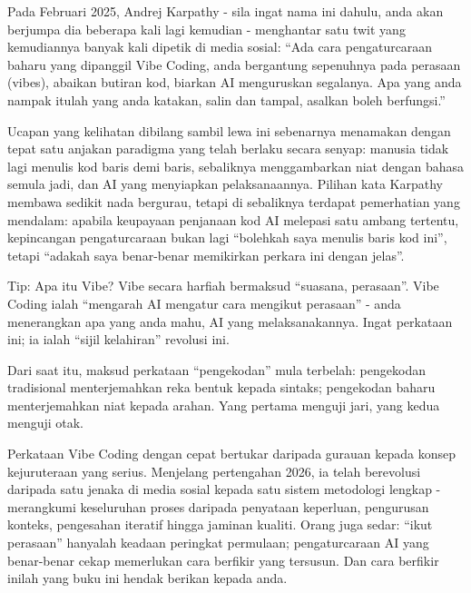 


Pada Februari 2025, Andrej Karpathy - sila ingat nama ini dahulu, anda akan berjumpa dia beberapa kali lagi kemudian - menghantar satu twit yang kemudiannya banyak kali dipetik di media sosial: “Ada cara pengaturcaraan baharu yang dipanggil Vibe Coding, anda bergantung sepenuhnya pada perasaan (vibes), abaikan butiran kod, biarkan AI menguruskan segalanya. Apa yang anda nampak itulah yang anda katakan, salin dan tampal, asalkan boleh berfungsi.”

Ucapan yang kelihatan dibilang sambil lewa ini sebenarnya menamakan dengan tepat satu anjakan paradigma yang telah berlaku secara senyap: manusia tidak lagi menulis kod baris demi baris, sebaliknya menggambarkan niat dengan bahasa semula jadi, dan AI yang menyiapkan pelaksanaannya. Pilihan kata Karpathy membawa sedikit nada bergurau, tetapi di sebaliknya terdapat pemerhatian yang mendalam: apabila keupayaan penjanaan kod AI melepasi satu ambang tertentu, kepincangan pengaturcaraan bukan lagi “bolehkah saya menulis baris kod ini”, tetapi “adakah saya benar-benar memikirkan perkara ini dengan jelas”.

\begin{tcbinfo}{Tip: Apa itu Vibe?}
Vibe secara harfiah bermaksud “suasana, perasaan”. Vibe Coding ialah “mengarah AI mengatur cara mengikut perasaan” - anda menerangkan apa yang anda mahu, AI yang melaksanakannya. Ingat perkataan ini; ia ialah “sijil kelahiran” revolusi ini.

\end{tcbinfo}

Dari saat itu, maksud perkataan “pengekodan” mula terbelah: pengekodan tradisional menterjemahkan reka bentuk kepada sintaks; pengekodan baharu menterjemahkan niat kepada arahan. Yang pertama menguji jari, yang kedua menguji otak.

Perkataan Vibe Coding dengan cepat bertukar daripada gurauan kepada konsep kejuruteraan yang serius. Menjelang pertengahan 2026, ia telah berevolusi daripada satu jenaka di media sosial kepada satu sistem metodologi lengkap - merangkumi keseluruhan proses daripada penyataan keperluan, pengurusan konteks, pengesahan iteratif hingga jaminan kualiti. Orang juga sedar: “ikut perasaan” hanyalah keadaan peringkat permulaan; pengaturcaraan AI yang benar-benar cekap memerlukan cara berfikir yang tersusun. Dan cara berfikir inilah yang buku ini hendak berikan kepada anda.

